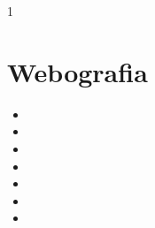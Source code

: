 \documentclass[a4paper,12pt]{book}
\begin{document}
\frontmatter
\fazerCapa
\frontmatter








\myTableOfContents
\myListOfTables
\myListOfFigures





\mainmatter
\myPageStyle





\appendix
%





\begin{thebibliography}{1}



\end{thebibliography}

\chapter*{Webografia}
\begin{itemize}
	\item[1]  

	\item[2] 
    
	\item[3] 

	\item[4] 

	\item[5] 

	\item[6] 

	\item[7] 
\end{itemize}

\end{document}
